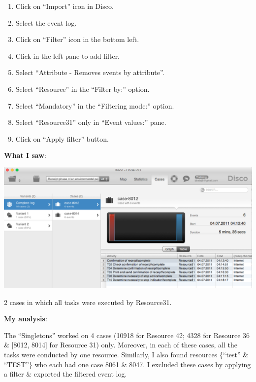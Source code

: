 \documentclass[]{article}
\begin{document}
\begin{enumerate}
\def\labelenumi{\arabic{enumi}.}
\setcounter{enumi}{10}
\itemsep1pt\parskip0pt
\item
  Click on ``Import'' icon in Disco.\\
\item
  Select the event log.\\
\item
  Click on ``Filter'' icon in the bottom left.\\
\item
  Click in the left pane to add filter.\\
\item
  Select ``Attribute - Removes events by attribute''.\\
\item
  Select ``Resource'' in the ``Filter by:'' option.\\
\item
  Select ``Mandatory'' in the ``Filtering mode:'' option.
\item
  Select ``Resource31'' only in ``Event values:'' pane.
\item
  Click on ``Apply filter'' button.
\end{enumerate}

\textbf{What I saw}:

\includegraphics{CoSeLog_Step07_Filter_Resource31.png}

2 cases in which all tasks were executed by Resource31.

\textbf{My analysis}:

The ``Singletons'' worked on 4 cases (10918 for Resource 42; 4328 for
Resource 36 \& {[}8012, 8014{]} for Resource 31) only. Moreover, in each
of these cases, all the tasks were conducted by one resource. Similarly,
I also found resources \{``test'' \& ``TEST''\} who each had one case
8061 \& 8047. I excluded these cases by applying a filter \& exported
the filtered event log.
\end{document}
